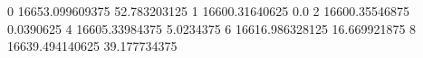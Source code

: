 0 16653.099609375 52.783203125
1 16600.31640625 0.0
2 16600.35546875 0.0390625
4 16605.33984375 5.0234375
6 16616.986328125 16.669921875
8 16639.494140625 39.177734375
